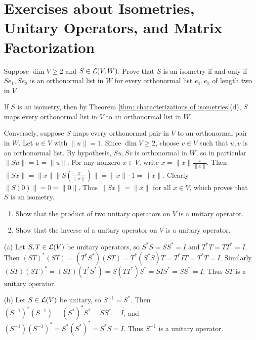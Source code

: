 \section*{Exercises about Isometries, Unitary Operators, and Matrix Factorization}

\begin{xrcs}
  Suppose $\dim V \geq 2$ and $S \in \mathcal{L}(V,W)$. Prove that $S$ is an isometry if and only if $Se_1, Se_2$ is an orthonormal list in $W$ for every orthonormal list $e_1, e_2$ of length two in $V$.

\begin{xprf}
  \Rightarrowdirection If $S$ is an isometry, then by Theorem \ref{thm: characterizations of isometries}(d), $S$ maps every orthonormal list in $V$ to an orthonormal list in $W$.

  \Leftarrowdirection Conversely, suppose $S$ maps every orthonormal pair in $V$ to an orthonormal pair in $W$.
  Let $u \in V$ with $\|u\| = 1$. Since $\dim V \ge 2$, choose $v \in V$ such that $u, v$ is an orthonormal list.
  By hypothesis, $Su, Sv$ is orthonormal in $W$, so in particular $\|Su\| = 1 = \|u\|$.
  For any nonzero $x \in V$, write $x = \|x\| \frac{x}{\|x\|}$. Then $\|Sx\| = \|x\| \|S(\frac{x}{\|x\|})\| = \|x\| \cdot 1 = \|x\|$.
  Clearly $\|S(0)\| = 0 = \|0\|$.
  Thus $\|Sx\| = \|x\|$ for all $x \in V$, which proves that $S$ is an isometry.
\end{xprf}
\end{xrcs}

\begin{xrcs}
  \begin{enumerate}[label=\textbf{(\alph*)}]
    \item Show that the product of two unitary operators on $V$ is a unitary operator.
    \item Show that the inverse of a unitary operator on $V$ is a unitary operator.
  \end{enumerate}

\begin{xprf}
  \StepOne (a) Let $S, T \in \mathcal{L}(V)$ be unitary operators, so $S^*S = SS^* = I$ and $T^*T = TT^* = I$.
  Then $(ST)^*(ST) = (T^*S^*)(ST) = T^*(S^*S)T = T^*IT = T^*T = I$.
  Similarly $(ST)(ST)^* = (ST)(T^*S^*) = S(TT^*)S^* = S I S^* = SS^* = I$.
  Thus $ST$ is a unitary operator.

  \StepTwo (b) Let $S \in \mathcal{L}(V)$ be unitary, so $S^{-1} = S^*$.
  Then $(S^{-1})^*(S^{-1}) = (S^*)^* S^* = SS^* = I$, and $(S^{-1})(S^{-1})^* = S^*(S^*)^* = S^*S = I$.
  Thus $S^{-1}$ is a unitary operator.
\end{xprf}
\end{xrcs}

